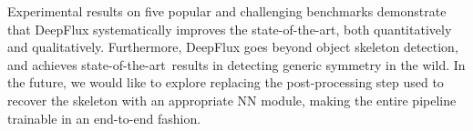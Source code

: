 \documentclass[10pt,twocolumn,letterpaper]{article}
\def\sota{state-of-the-art}
\begin{document}
Experimental results on five popular and challenging benchmarks demonstrate that DeepFlux systematically improves the state-of-the-art, both quantitatively and qualitatively.
Furthermore, DeepFlux goes beyond object skeleton detection, and achieves \sota\ results in detecting generic symmetry in the wild.
In the future, we would like to explore replacing the post-processing step used to recover the skeleton with an appropriate NN module, making the entire pipeline trainable in an end-to-end  fashion.


{\small


}
\end{document}
